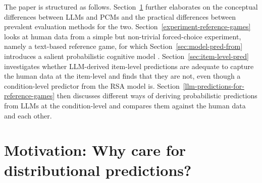 \documentclass[fleqn]{article}
\begin{document}
The paper is structured as follows.
Section~\ref{motivation} further elaborates on the conceptual differences between LLMs and PCMs and the practical differences between prevalent evaluation methods for the two.
Section~\ref{experiment-reference-games} looks at human data from a simple but non-trivial forced-choice experiment, namely a text-based reference game, for which Section~\ref{sec:model-pred-from} introduces a salient probabilistic cognitive model \citep{FrankGoodman2012:Predicting-Prag}.
Section~\ref{sec:item-level-pred} investigates whether LLM-derived item-level predictions are adequate to capture the human data at the item-level and finds that they are not, even though a condition-level predictor from the RSA model is.
Section~\ref{llm-predictions-for-reference-games} then discusses different ways of deriving probabilistic predictions from LLMs at the condition-level and compares them against the human data and each other.


\section{Motivation: Why care for distributional predictions?}
\label{motivation}
\end{document}
